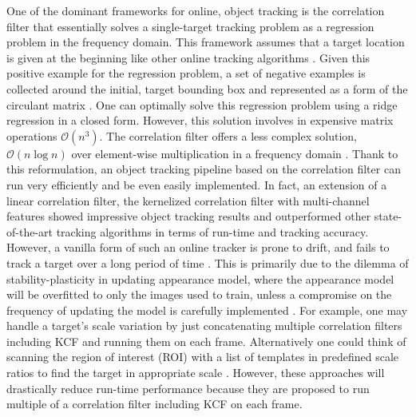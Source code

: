 \documentclass[10pt,twocolumn,letterpaper]{article}
\begin{document}
One of the dominant frameworks for online, object tracking is the
correlation filter that essentially solves a single-target tracking
problem as a regression problem in the frequency domain. This
framework assumes that a target location is given at the beginning
like other online tracking algorithms
\cite{smeulders2014survey}. Given this positive example for the
regression problem, a set of negative examples is collected around the
initial, target bounding box and represented as a form of the
circulant matrix \cite{henriques2015high}. One can optimally solve
this regression problem using a ridge regression in a closed
form. However, this solution involves in expensive matrix operations
$\mathcal{O}(n^{3})$. The correlation filter offers a less complex
solution, $\mathcal{O}(n\log n)$ over element-wise multiplication in a
frequency domain \cite{bolme2010visual,henriques2015high}. Thank to
this reformulation, an object tracking pipeline based on the
correlation filter can run very efficiently and be even easily
implemented. In fact, an extension of a linear correlation filter, the
kernelized correlation filter with multi-channel features
\cite{henriques2015high} showed impressive object tracking results and
outperformed other state-of-the-art tracking algorithms in terms of
run-time and tracking accuracy. However, a vanilla form of such an
online tracker is prone to drift, and fails to track a target over a
long period of time \cite{henriques2015high}. This is primarily due to
the dilemma of stability-plasticity in updating appearance model,
where the appearance model will be overfitted to only the images used
to train, unless a compromise on the frequency of updating the model
is carefully implemented \cite{santner2010prost}. For example, one may
handle a target's scale variation by just concatenating multiple
correlation filters including KCF and running them on each
frame. Alternatively one could think of scanning the region of
interest (ROI) with a list of templates in predefined scale ratios to
find the target in appropriate scale
\cite{henriques2015high,tang2015multi,ma2015long,bibi2015multi,li2014scale}. However,
these approaches will drastically reduce run-time performance because
they are proposed to run multiple of a correlation filter including
KCF on each frame.
\end{document}
